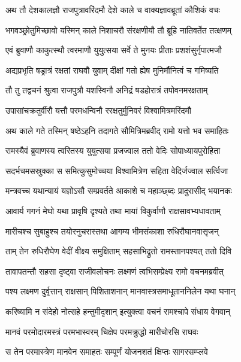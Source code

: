 
\twolineshloka
{अथ तौ देशकालज्ञौ राजपुत्रावरिंदमौ}
{देशे काले च वाक्यज्ञावब्रूतां कौशिकं वचः} %

\twolineshloka
{भगवञ्छ्रोतुमिच्छावो यस्मिन् काले निशाचरौ}
{संरक्षणीयौ तौ ब्रूहि नातिवर्तेत तत्क्षणम्} %

\twolineshloka
{एवं ब्रुवाणौ काकुत्स्थौ त्वरमाणौ युयुत्सया}
{सर्वे ते मुनयः प्रीताः प्रशशंसुर्नृपात्मजौ} %

\twolineshloka
{अद्यप्रभृति षड्रात्रं रक्षतां राघवौ युवाम्}
{दीक्षां गतो ह्येष मुनिर्मौनित्वं च गमिष्यति} %

\twolineshloka
{तौ तु तद्वचनं श्रुत्वा राजपुत्रौ यशस्विनौ}
{अनिद्रं षडहोरात्रं तपोवनमरक्षताम्} %

\twolineshloka
{उपासांचक्रतुर्वीरौ यत्तौ परमधन्विनौ}
{ररक्षतुर्मुनिवरं विश्वामित्रमरिंदमौ} %

\twolineshloka
{अथ काले गते तस्मिन् षष्ठेऽहनि तदागते}
{सौमित्रिमब्रवीद् रामो यत्तो भव समाहितः} %

\twolineshloka
{रामस्यैवं ब्रुवाणस्य त्वरितस्य युयुत्सया}
{प्रजज्वाल ततो वेदिः सोपाध्यायपुरोहिता} %

\twolineshloka
{सदर्भचमसस्रुक्का स समित्कुसुमोच्चया}
{विश्वामित्रेण सहिता वेदिर्जज्वाल सर्त्विजा} %

\twolineshloka
{मन्त्रवच्च यथान्यायं यज्ञोऽसौ सम्प्रवर्तते}
{आकाशे च महाञ्छ्ब्दः प्रादुरासीद् भयानकः} %

\twolineshloka
{आवार्य गगनं मेघो यथा प्रावृषि दृश्यते}
{तथा मायां विकुर्वाणौ राक्षसावभ्यधावताम्} %

\twolineshloka
{मारीचश्च सुबाहुश्च तयोरनुचरास्तथा}
{आगम्य भीमसंकाशा रुधिरौघानवासृजन्} %

\twolineshloka
{ताम् तेन रुधिरौघेण वेदीं वीक्ष्य समुक्षिताम्}
{सहसाभिद्रुतो रामस्तानपश्यत् ततो दिवि} %

\twolineshloka
{तावापतन्तौ सहसा दृष्ट्वा राजीवलोचनः}
{लक्ष्मणं त्वभिसम्प्रेक्ष्य रामो वचनमब्रवीत्} %

\twolineshloka
{पश्य लक्ष्मण दुर्वृत्तान् राक्षसान् पिशिताशनान्}
{मानवास्त्रसमाधूताननिलेन यथा घनान्} %

\twolineshloka
{करिष्यामि न संदेहो नोत्सहे हन्तुमीदृशान्}
{इत्युक्त्वा वचनं रामश्चापे संधाय वेगवान्} %

\twolineshloka
{मानवं परमोदारमस्त्रं परमभास्वरम्}
{चिक्षेप परमक्रुद्धो मारीचोरसि राघवः} %

\twolineshloka
{स तेन परमास्त्रेण मानवेन समाहतः}
{सम्पूर्णं योजनशतं क्षिप्तः सागरसम्प्लवे} %

